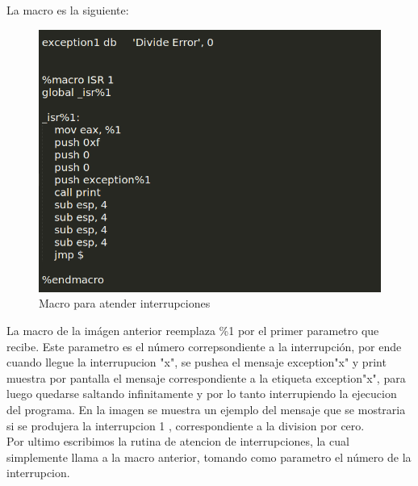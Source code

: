 La macro es la siguiente:
  \begin{figure}[H]
\begin{center}
  \includegraphics[width=\linewidth]{ejercicio2/macro.png}
  \caption{{\small Macro para atender interrupciones} }
\endminipage
\end{center}
\end{figure}

La macro de la imágen anterior reemplaza  \%1 por el primer parametro que recibe. Este parametro es el número correpsondiente a la interrupción, por ende cuando llegue la interrupucion "x", se pushea el mensaje exception"x" y print muestra por pantalla el mensaje correspondiente a la etiqueta exception"x", para luego quedarse saltando infinitamente y por lo tanto interrupiendo la ejecucion del programa. En la imagen se muestra un ejemplo del mensaje que se mostraria si se produjera la interrupcion 1 , correspondiente a la division por cero.\\

Por ultimo escribimos la rutina de atencion de interrupciones, la cual simplemente llama a la macro anterior, tomando como parametro el número de la interrupcion.

